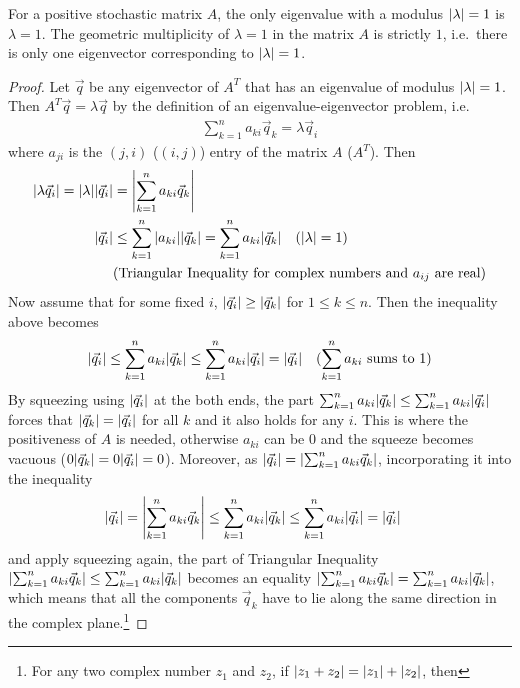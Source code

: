 \begin{proper}
\label{proper:positivestoceig}
For a positive stochastic matrix $A$, the only eigenvalue with a modulus $\abs{\lambda} = 1$ is $\lambda = 1$. The geometric multiplicity of $\lambda = 1$ in the matrix $A$ is strictly $1$, i.e.\ there is only one eigenvector corresponding to $\abs{\lambda} = 1$.
\end{proper}
\begin{proof}
Let $\vec{q}$ be any eigenvector of $A^T$ that has an eigenvalue of modulus $\abs{\lambda} = 1$. Then $A^T\vec{q} = \lambda \vec{q}$ by the definition of an eigenvalue-eigenvector problem, i.e.\
\begin{align*}
\sum_{k=1}^{n} a_{ki}\vec{q}_k = \lambda \vec{q}_i
\end{align*}
where $a_{ji}$ is the $(j,i)$ ($(i,j)$) entry of the matrix $A$ ($A^T$). Then
\begin{align*}
\abs{\lambda \vec{q}_i} = \abs{\lambda}\abs{\vec{q}_i} &= \abs{\sum_{k=1}^{n} a_{ki}\vec{q}_k} \\
\abs{\vec{q}_i} &\leq \sum_{k=1}^{n} \abs{a_{ki}}\abs{\vec{q}_k} = \sum_{k=1}^{n} a_{ki}\abs{\vec{q}_k} \quad (\abs{\lambda} = 1)\\
&\text{(Triangular Inequality for complex numbers and $a_{ij}$ are real)}
\end{align*}
Now assume that for some fixed $i$, $\abs{\vec{q}_i} \geq \abs{\vec{q}_k}$ for $1 \leq k \leq n$. Then the inequality above becomes
\begin{align*}
\abs{\vec{q}_i} \leq \sum_{k=1}^{n} a_{ki}\abs{\vec{q}_k} &\leq \sum_{k=1}^{n} a_{ki}\abs{\vec{q}_i} = \abs{\vec{q}_i}  & \text{($\sum_{k=1}^{n} a_{ki}$ sums to $1$)}
\end{align*}
By squeezing using $\abs{\vec{q}_i}$ at the both ends, the part $\sum_{k=1}^{n} a_{ki}\abs{\vec{q}_k} \leq \sum_{k=1}^{n} a_{ki}\abs{\vec{q}_i}$ forces that $\abs{\vec{q}_k} = \abs{\vec{q}_i}$ for all $k$ and it also holds for any $i$. This is where the positiveness of $A$ is needed, otherwise $a_{ki}$ can be $0$ and the squeeze becomes vacuous ($0\abs{\vec{q}_k} = 0\abs{\vec{q}_i} = 0$). Moreover, as $\abs{\vec{q}_i} = \abs{\sum_{k=1}^{n} a_{ki}\vec{q}_k}$, incorporating it into the inequality
\begin{align*}
\abs{\vec{q}_i} = \abs{\sum_{k=1}^{n} a_{ki}\vec{q}_k} \leq \sum_{k=1}^{n} a_{ki}\abs{\vec{q}_k} &\leq \sum_{k=1}^{n} a_{ki}\abs{\vec{q}_i} = \abs{\vec{q}_i}
\end{align*}
and apply squeezing again, the part of Triangular Inequality $\abs{\sum_{k=1}^{n} a_{ki}\vec{q}_k} \leq \sum_{k=1}^{n} a_{ki}\abs{\vec{q}_k}$ becomes an equality $\abs{\sum_{k=1}^{n} a_{ki}\vec{q}_k} = \sum_{k=1}^{n} a_{ki}\abs{\vec{q}_k}$, which means that all the components $\vec{q}_k$ have to lie along the same direction in the complex plane.\footnote{For any two complex number $z_1$ and $z_2$, if $\abs{z_1 + z_2} = \abs{z_1} + \abs{z_2}$, then
}
\end{proof}
